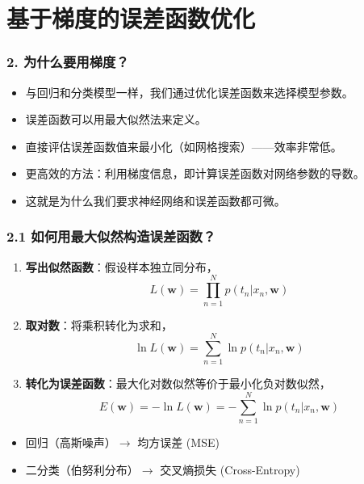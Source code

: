 \documentclass[t,aspectratio=169]{beamer} %
\begin{document}
\section{基于梯度的误差函数优化}

\begin{frame}
    \frametitle{2. 为什么要用梯度？}
    \begin{itemize}
        \item 与回归和分类模型一样，我们通过\alert{优化误差函数}来选择模型参数。
        \item 误差函数可以用\alert{最大似然法}来定义。
        \item 直接评估误差函数值来最小化（如网格搜索）——\alert{效率非常低}。
        \item 更高效的方法：\alert{利用梯度信息}，即计算误差函数对网络参数的导数。
        \item 这就是为什么我们要求神经网络和误差函数都\alert{可微}。
    \end{itemize}
\end{frame}

\begin{frame}
    \frametitle{2.1 如何用最大似然构造误差函数？}
    \begin{enumerate}
        \item \textbf{写出似然函数}：假设样本独立同分布，
        \[
        L(\mathbf{w}) = \prod_{n=1}^{N} p(t_n | x_n, \mathbf{w})
        \]
        \item \textbf{取对数}：将乘积转化为求和，
        \[
        \ln L(\mathbf{w}) = \sum_{n=1}^{N} \ln p(t_n | x_n, \mathbf{w})
        \]
        \item \textbf{转化为误差函数}：最大化对数似然等价于最小化负对数似然，
        \[
        E(\mathbf{w}) = -\ln L(\mathbf{w}) = -\sum_{n=1}^{N} \ln p(t_n | x_n, \mathbf{w})
        \]
    \end{enumerate}
    \begin{itemize}
        \item 回归（高斯噪声）$\rightarrow$ 均方误差 (MSE)
        \item 二分类（伯努利分布）$\rightarrow$ 交叉熵损失 (Cross-Entropy)
    \end{itemize}
\end{frame}
\end{document}
